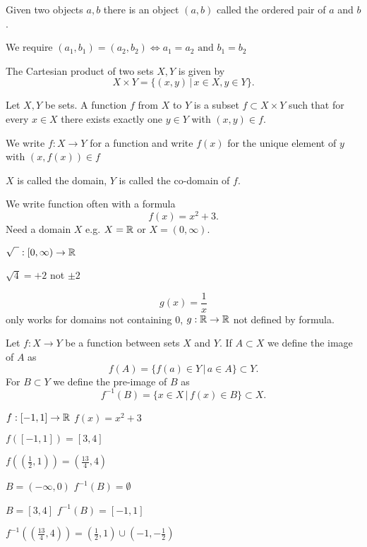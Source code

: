\documentclass[10pt, a4paper]{article}
\begin{document}
Given two objects $a, b$ there is an object $(a, b)$ called the ordered pair of $a$ and $b$.

We require $(a_1, b_1) = (a_2, b_2) \iff a_1 = a_2 \text{ and } b_1 = b_2$

\begin{definition}
    The Cartesian product of two sets $X, Y$ is given by
    \[
    X \times Y = \{(x, y)\, |\, x \in X, y \in Y\}.
    \]
\end{definition}

\begin{definition}[Function]
    Let $X, Y$ be sets.
    A function $f$ from $X$ to $Y$ is a subset $f \subset X \times Y$ such that
    for every $x \in X$ there exists exactly one $y \in Y$ with $(x, y) \in f$.
    
    We write $f : X \rightarrow Y$ for a function and
    write $f(x)$ for the unique element of $y$ with $(x, f(x)) \in f$

    $X$ is called the domain,
    $Y$ is called the co-domain of $f$.
\end{definition}
We write function often with a formula
\[
f(x) = x ^ 2 + 3.
\]
Need a domain $X$ e.g. $X = \mathbb{R}$ or $X = (0, \infty)$.

\begin{example}
    $\sqrt{\phantom{1}} : [0, \infty) \rightarrow \mathbb{R}$

    $\sqrt{4} = +2$ not $\pm2$
\end{example}
\begin{example}
    \[
    g(x) = \frac{1}{x}
    \]
    only works for domains not containing $0$, $g: \mathbb{R} \rightarrow \mathbb{R}$ not defined by formula.
\end{example}

\begin{definition}
    Let $f : X \rightarrow Y$ be a function between sets $X$ and $Y$. If $A \subset X$ we define the image of $A$ as
    \[
    f(A) = \{f(a) \in Y\,|\, a \in A\} \subset Y.
    \]
    For $B \subset Y$ we define the pre-image of $B$ as
    \[
    f^{-1}(B) = \{x \in X\,|\,f(x) \in B\} \subset X.
    \]
\end{definition}

\begin{example}
    $f: [-1, 1] \rightarrow \mathbb{R}$ $f(x) = x ^ 2 + 3$

    $f([-1, 1]) = [3, 4]$

    $f\left(\left(\frac{1}{2}, 1\right)\right) = \left(\frac{13}{4}, 4\right)$

    $B = (-\infty, 0)$
    $f^{-1}(B) = \emptyset$

    $B = [3, 4]$
    $f^{-1}(B) = [-1, 1]$
    
    $f^{-1}\left(\left(\frac{13}{4}, 4\right)\right) =
    \left(\frac{1}{2}, 1\right) \cup \left(-1, -\frac{1}{2}\right)$
\end{example}
\end{document}
